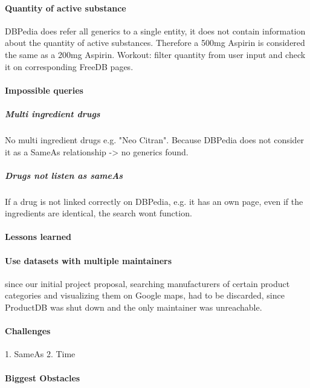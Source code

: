 \documentclass[11pt,titlepage,oneside,openany]{book}
\begin{document}
\paragraph{Quantity of active substance}
DBPedia does refer all generics to a single entity, it does not contain information about the quantity of active substances. Therefore a 500mg Aspirin is considered the same as a 200mg Aspirin.
Workout: filter quantity from user input and check it on corresponding FreeDB pages.



\paragraph{Impossible queries}
\label{sec:unquery}
\subparagraph{Multi ingredient drugs}No multi ingredient drugs e.g. "Neo Citran". Because DBPedia does not consider it as a SameAs relationship -> no generics found.

\subparagraph{Drugs not listen as sameAs}
If a drug is not linked correctly on DBPedia, e.g. it has an own page, even if the ingredients are identical, the search wont function.


\paragraph{Lessons learned}
\label{cha:lessons}


\paragraph{Use datasets with multiple maintainers} since our initial project proposal, searching manufacturers of certain product categories and visualizing them on Google maps, had to be discarded, since ProductDB was shut down and the only maintainer was unreachable.


\paragraph{Challenges}
\label{sec:challenges}

1. SameAs 
2. Time

\paragraph{Biggest Obstacles}
\label{sec:obstacle}

\label{sec:idea}
\end{document}
